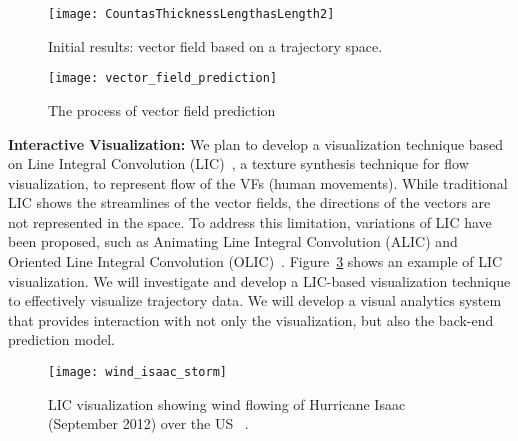 
\begin{figure}[t]
	\centering
	\texttt{[image: CountasThicknessLengthasLength2]}
	\caption{Initial results: vector field based on a trajectory space.}
	\label{fig:vector_field}
\end{figure}

\begin{figure}[t]
	\centering
	\texttt{[image: vector\_field\_prediction]}
	\caption{The process of vector field prediction}
	\label{fig:vector_prediction}
\end{figure}

\textbf{Interactive Visualization:} 
We plan to develop a visualization technique based on Line Integral Convolution (LIC)~\cite{Cabral:1993:Imaging}, a texture synthesis technique for flow visualization, to represent flow of the VFs (human movements).
While traditional LIC shows the streamlines of the vector fields, the directions of the vectors are not represented in the space.
To address this limitation, variations of LIC have been proposed, such as Animating Line Integral Convolution (ALIC) and Oriented Line Integral Convolution (OLIC)~\cite{Wegenkittl:1997:Animating,Wegenkittl:1997:Fast}.
Figure~\ref{fig:wind_isaac} shows an example of LIC visualization.
We will investigate and develop a LIC-based visualization technique to effectively visualize trajectory data.
We will develop a visual analytics system that provides interaction with not only the visualization, but also the back-end prediction model.


\begin{figure}[t]
	\centering
	\texttt{[image: wind\_isaac\_storm]}
	\caption{LIC visualization showing wind flowing of Hurricane Isaac (September 2012) over the US
	~\cite{VW:2015:Windmap}.}
	\label{fig:wind_isaac}
\end{figure}


